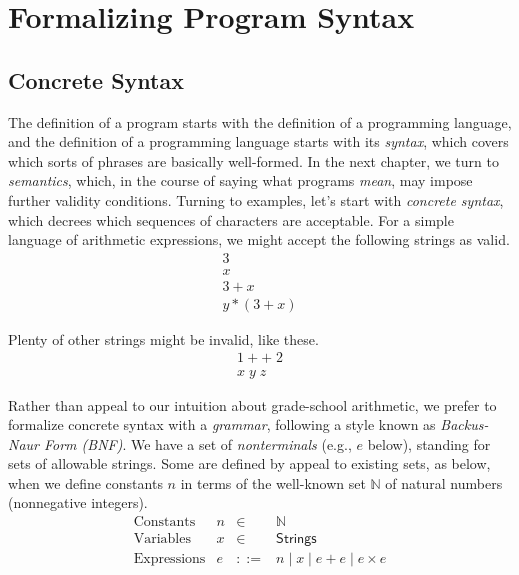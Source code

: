 \documentclass{amsbook}
\theoremstyle{definition}
\theoremstyle{remark}
\numberwithin{section}{chapter}
\numberwithin{equation}{chapter}
\begin{document}
\chapter{Formalizing Program Syntax}

\section{Concrete Syntax}

The definition of a program starts with the definition of a programming language, and the definition of a programming language starts with its \emph{syntax}, which covers which sorts of phrases are basically well-formed.
In the next chapter, we turn to \emph{semantics}, which, in the course of saying what programs \emph{mean}, may impose further validity conditions.
Turning to examples, let's start with \emph{concrete syntax}, which decrees which sequences of characters are acceptable.
For a simple language of arithmetic expressions, we might accept the following strings as valid.
$$\begin{array}{l}
  3 \\
  x \\
  3 + x \\
  y * (3 + x)
\end{array}$$

Plenty of other strings might be invalid, like these.
$$\begin{array}{l}
  1 + + \; 2 \\
  x \; y \; z
\end{array}$$

Rather than appeal to our intuition about grade-school arithmetic, we prefer to formalize concrete syntax with a \emph{grammar}, following a style known as \emph{Backus-Naur Form (BNF)}.
We have a set of \emph{nonterminals} (e.g., $e$ below), standing for sets of allowable strings.
Some are defined by appeal to existing sets, as below, when we define constants $n$ in terms of the well-known set $\mathbb N$ of natural numbers (nonnegative integers).
\encoding
$$\begin{array}{rrcl}
  \textrm{Constants} & n &\in& \mathbb N \\
  \textrm{Variables} & x &\in& \mathsf{Strings} \\
  \textrm{Expressions} & e &::=& n \mid x \mid e + e \mid e \times e
\end{array}$$
\end{document}
